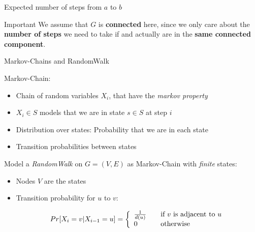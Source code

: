 \begin{frame}{Expected number of steps from $a$ to $b$}

\begin{block}{Important}
We assume that $G$ is \textbf{connected} here, since we only care about
the \textbf{number of steps} we need to take if  and 
actually are in the \textbf{same connected component}.
\end{block}

\end{frame}

\begin{frame}{Markov-Chains and RandomWalk}

Markov-Chain:

\begin{itemize}
\itemsep1pt\parskip0pt
\item
  Chain of random variables $X_i$, that have the \emph{markov property}
\item
  $X_i \in S$ models that we are in state $s \in S$ at step $i$
\item
  Distribution over states: Probability that we are in each state
\item
  Transition probabilities between states
\end{itemize}

Model a \emph{RandomWalk} on $G = (V, E)$ as Markov-Chain with
\emph{finite} states:

\begin{itemize}
\item
  Nodes $V$ are the states
\item
  Transition probability for $u$ to $v$:

  \[ Pr[X_i = v | X_{i-1} = u] = \left\{
    \begin{array}{l l}
      \frac{1}{d(u)} & \quad \text{if $v$ is adjacent to $u$}\\
      0 & \quad \text{otherwise}
    \end{array} \right.
  \]
\end{itemize}

\end{frame}

